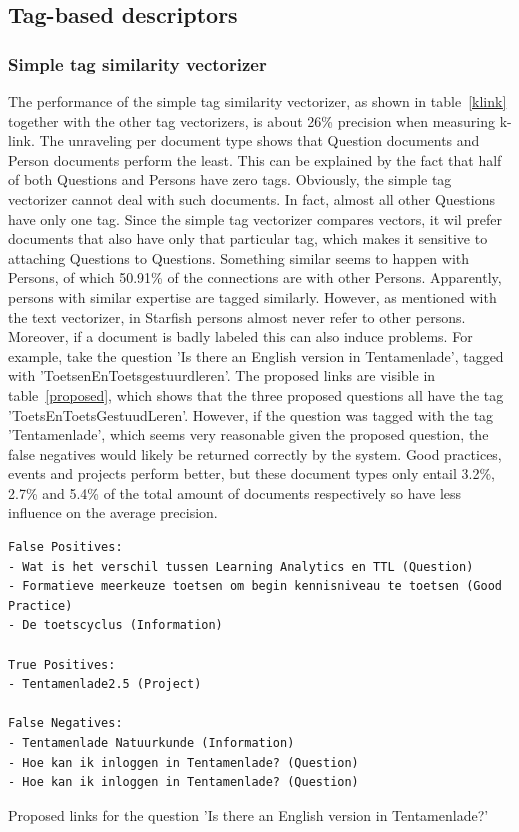 \subsection{Tag-based descriptors}

\subsubsection{Simple tag similarity vectorizer} 
The performance of the simple tag similarity vectorizer, as shown in
table~\ref{klink} together with the other tag vectorizers, is about 26\%
precision when measuring k-link. The unraveling per document type shows that
Question documents and Person documents perform the least. This can be
explained by the fact that half of both Questions and Persons have zero tags.
Obviously, the simple tag vectorizer cannot deal with such documents. In fact,
almost all other Questions have only one tag. Since the simple tag vectorizer
compares vectors, it wil prefer documents that also have only that particular
tag, which makes it sensitive to attaching Questions to Questions. Something
similar seems to happen with Persons, of which 50.91\% of the connections are
with other Persons.  Apparently, persons with similar expertise are tagged
similarly.  However, as mentioned with the text vectorizer, in Starfish persons
almost never refer to other persons. Moreover, if a document is badly labeled
this can also induce problems. For example, take the question 'Is there an
English version in Tentamenlade', tagged with 'ToetsenEnToetsgestuurdleren'.
The proposed links are visible in table~\ref{proposed}, which shows that  the
three proposed questions all have the tag 'ToetsEnToetsGestuudLeren'. However,
if the question was tagged with the tag 'Tentamenlade', which seems very
reasonable given the proposed question, the false negatives would likely be
returned correctly by the system. Good practices, events and projects perform
better, but these document types only entail 3.2\%, 2.7\% and 5.4\% of the
total amount of documents respectively so have less influence on the average
precision.

\begin{table}
\begin{lstlisting}
False Positives:
- Wat is het verschil tussen Learning Analytics en TTL (Question)
- Formatieve meerkeuze toetsen om begin kennisniveau te toetsen (Good Practice)
- De toetscyclus (Information)

True Positives:
- Tentamenlade2.5 (Project)

False Negatives:
- Tentamenlade Natuurkunde (Information)
- Hoe kan ik inloggen in Tentamenlade? (Question)
- Hoe kan ik inloggen in Tentamenlade? (Question)
\end{lstlisting}
\caption{Proposed links for the question 'Is there an English version in Tentamenlade?'}
\label{proposed}
\end{table}

